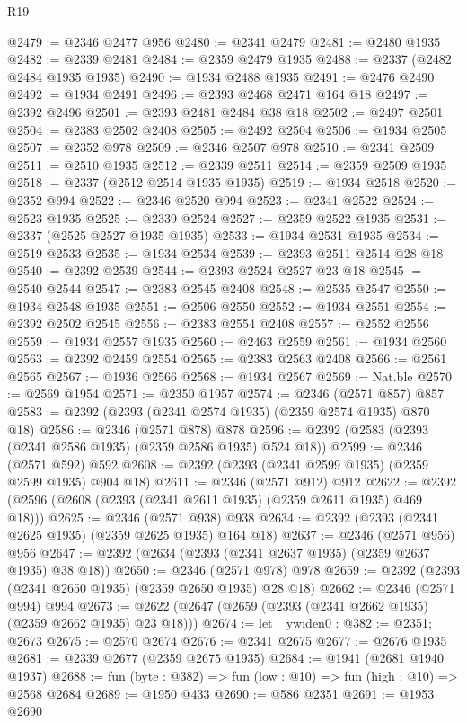 \begin{lexlean}{R19}
\begin{coremodule}
{{{{{{{{{{{{{{{{{{{{{{{{{{{{{{{{{{{{{{{{{{{{{{{{{{{{{{{{{{{{{{{{{{{{{{{{{{{{{{{{{{{{{{{@2479 := @2346 @2477 @956
@2480 := @2341 @2479
@2481 := @2480 @1935
@2482 := @2339 @2481
@2484 := @2359 @2479 @1935
@2488 := @2337 (@2482 @2484 @1935 @1935)
@2490 := @1934 @2488 @1935
@2491 := @2476 @2490
@2492 := @1934 @2491
@2496 := @2393 @2468 @2471 @164 @18
@2497 := @2392 @2496
@2501 := @2393 @2481 @2484 @38 @18
@2502 := @2497 @2501
@2504 := @2383 @2502 @2408
@2505 := @2492 @2504
@2506 := @1934 @2505
@2507 := @2352 @978
@2509 := @2346 @2507 @978
@2510 := @2341 @2509
@2511 := @2510 @1935
@2512 := @2339 @2511
@2514 := @2359 @2509 @1935
@2518 := @2337 (@2512 @2514 @1935 @1935)
@2519 := @1934 @2518
@2520 := @2352 @994
@2522 := @2346 @2520 @994
@2523 := @2341 @2522
@2524 := @2523 @1935
@2525 := @2339 @2524
@2527 := @2359 @2522 @1935
@2531 := @2337 (@2525 @2527 @1935 @1935)
@2533 := @1934 @2531 @1935
@2534 := @2519 @2533
@2535 := @1934 @2534
@2539 := @2393 @2511 @2514 @28 @18
@2540 := @2392 @2539
@2544 := @2393 @2524 @2527 @23 @18
@2545 := @2540 @2544
@2547 := @2383 @2545 @2408
@2548 := @2535 @2547
@2550 := @1934 @2548 @1935
@2551 := @2506 @2550
@2552 := @1934 @2551
@2554 := @2392 @2502 @2545
@2556 := @2383 @2554 @2408
@2557 := @2552 @2556
@2559 := @1934 @2557 @1935
@2560 := @2463 @2559
@2561 := @1934 @2560
@2563 := @2392 @2459 @2554
@2565 := @2383 @2563 @2408
@2566 := @2561 @2565
@2567 := @1936 @2566
@2568 := @1934 @2567
@2569 := Nat.ble
@2570 := @2569 @1954
@2571 := @2350 @1957
@2574 := @2346 (@2571 @857) @857
@2583 := @2392 (@2393 (@2341 @2574 @1935) (@2359 @2574 @1935) @870 @18)
@2586 := @2346 (@2571 @878) @878
@2596 := @2392 (@2583 (@2393 (@2341 @2586 @1935) (@2359 @2586 @1935) @524 @18))
@2599 := @2346 (@2571 @592) @592
@2608 := @2392 (@2393 (@2341 @2599 @1935) (@2359 @2599 @1935) @904 @18)
@2611 := @2346 (@2571 @912) @912
@2622 := @2392 (@2596 (@2608 (@2393 (@2341 @2611 @1935) (@2359 @2611 @1935) @469 @18)))
@2625 := @2346 (@2571 @938) @938
@2634 := @2392 (@2393 (@2341 @2625 @1935) (@2359 @2625 @1935) @164 @18)
@2637 := @2346 (@2571 @956) @956
@2647 := @2392 (@2634 (@2393 (@2341 @2637 @1935) (@2359 @2637 @1935) @38 @18))
@2650 := @2346 (@2571 @978) @978
@2659 := @2392 (@2393 (@2341 @2650 @1935) (@2359 @2650 @1935) @28 @18)
@2662 := @2346 (@2571 @994) @994
@2673 := @2622 (@2647 (@2659 (@2393 (@2341 @2662 @1935) (@2359 @2662 @1935) @23 @18)))
@2674 := let _ywiden0 : @382 := @2351; @2673
@2675 := @2570 @2674
@2676 := @2341 @2675
@2677 := @2676 @1935
@2681 := @2339 @2677 (@2359 @2675 @1935)
@2684 := @1941 (@2681 @1940 @1937)
@2688 := fun (byte : @382) => fun (low : @10) => fun (high : @10) => @2568 @2684
@2689 := @1950 @433
@2690 := @586 @2351
@2691 := @1953 @2690
}}}}}}}}}}}}}}}}}}}}}}}}}}}}}}}}}}}}}}}}}}}}}}}}}}}}}}}}}}}}}}}}}}}}}}}}}}}}}}}}}}}}}}}
\end{coremodule}
\end{lexlean}

